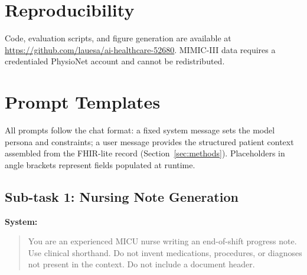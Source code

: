 \documentclass[sigconf,anonymous=false,review=false]{acmart}
\begin{document}
\section*{Reproducibility}

Code, evaluation scripts, and figure generation are available at
\url{https://github.com/lauesa/ai-healthcare-52680}.
MIMIC-III data requires a credentialed PhysioNet account and cannot be
redistributed.

\clearpage



\appendix

\section{Prompt Templates}
\label{app:prompts}

All prompts follow the chat format: a fixed system message sets the model
persona and constraints; a user message provides the structured patient
context assembled from the FHIR-lite record (Section~\ref{sec:methods}).
Placeholders in angle brackets represent fields populated at runtime.

\subsection*{Sub-task 1: Nursing Note Generation}

\textbf{System:}
\begin{quote}
\small
You are an experienced MICU nurse writing an end-of-shift progress note.
Use clinical shorthand. Do not invent medications, procedures, or diagnoses
not present in the context. Do not include a document header.
\end{quote}
\end{document}
